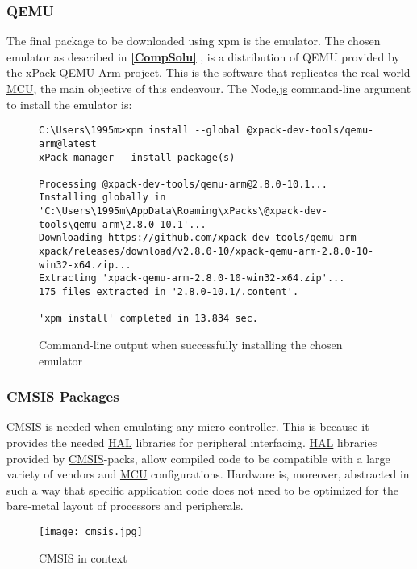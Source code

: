 \subsubsection{QEMU}
\label{qemu}
The final package to be downloaded using xpm is the emulator. The chosen emulator as described in \textbf{\ref{CompSolu} }, is a distribution of QEMU provided by the xPack QEMU Arm project. This is the software that replicates the real-world \hyperref[listAbr]{MCU}, the main objective of this endeavour. The Node\hyperref[listExt]{.js} command-line argument to install the emulator is:
\begin{figure}[H]
\begin{center}
\begin{lstlisting}[style=DOS]
C:\Users\1995m>xpm install --global @xpack-dev-tools/qemu-arm@latest
xPack manager - install package(s)

Processing @xpack-dev-tools/qemu-arm@2.8.0-10.1...
Installing globally in 'C:\Users\1995m\AppData\Roaming\xPacks\@xpack-dev-tools\qemu-arm\2.8.0-10.1'...
Downloading https://github.com/xpack-dev-tools/qemu-arm-xpack/releases/download/v2.8.0-10/xpack-qemu-arm-2.8.0-10-win32-x64.zip...
Extracting 'xpack-qemu-arm-2.8.0-10-win32-x64.zip'...
175 files extracted in '2.8.0-10.1/.content'.

'xpm install' completed in 13.834 sec.
\end{lstlisting}
\caption{Command-line output when successfully installing the chosen emulator}
\label{fig:cmd5}
\end{center}
\end{figure}

\subsubsection{CMSIS Packages}
\label{qemu}
\hyperref[listAbr]{CMSIS} is needed when emulating any micro-controller. This is because it provides the needed \hyperref[listAbr]{HAL} libraries for peripheral interfacing. \hyperref[listAbr]{HAL} libraries provided by \hyperref[listAbr]{CMSIS}-packs, allow compiled code to be compatible with a large variety of vendors and \hyperref[listAbr]{MCU} configurations. Hardware is, moreover, abstracted in such a way that specific application code does not need to be optimized for the bare-metal layout of processors and peripherals. 

\begin{figure}[H]
\begin{center}
\texttt{[image: cmsis.jpg]}
\caption{CMSIS in context}
\label{fig:cmsis.jpg}
\end{center}
\end{figure}

